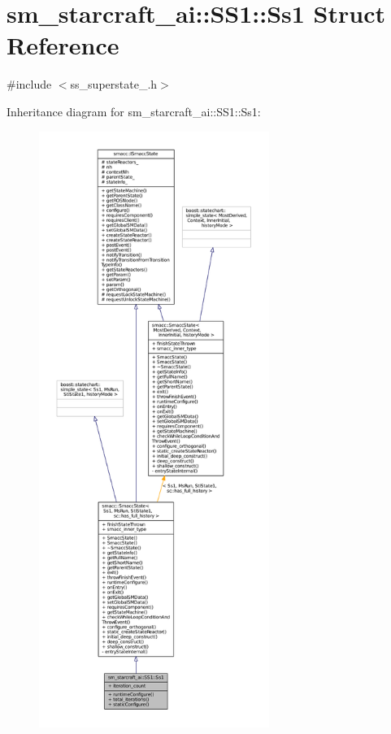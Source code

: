 \hypertarget{structsm__starcraft__ai_1_1SS1_1_1Ss1}{}\section{sm\+\_\+starcraft\+\_\+ai\+:\+:S\+S1\+:\+:Ss1 Struct Reference}
\label{structsm__starcraft__ai_1_1SS1_1_1Ss1}


{\ttfamily \#include $<$ss\+\_\+superstate\+\_.\+h$>$}



Inheritance diagram for sm\+\_\+starcraft\+\_\+ai\+:\+:S\+S1\+:\+:Ss1\+:
\nopagebreak
\begin{figure}[H]
\begin{center}
\leavevmode
\includegraphics[height=550pt]{structsm__starcraft__ai_1_1SS1_1_1Ss1__inherit__graph}
\end{center}
\end{figure}


